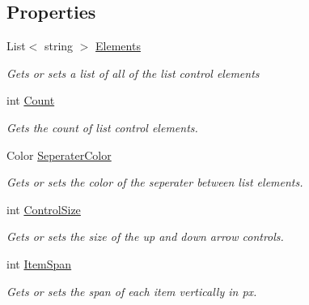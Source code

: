 \subsection*{Properties}
\begin{DoxyCompactItemize}
\item 
List$<$ string $>$ \hyperlink{class_m_b2_d_1_1_u_i_1_1_list_control_a868436cd81ebe891d8748da7b48a7c30}{Elements}
\begin{DoxyCompactList}\small\item\em Gets or sets a list of all of the list control elements \end{DoxyCompactList}\item 
int \hyperlink{class_m_b2_d_1_1_u_i_1_1_list_control_a231b53abfe2a6040567bb6bc3bf1cee4}{Count}
\begin{DoxyCompactList}\small\item\em Gets the count of list control elements. \end{DoxyCompactList}\item 
Color \hyperlink{class_m_b2_d_1_1_u_i_1_1_list_control_ac5c3ad4a524d48a490f7e4bfa088c0e1}{Seperater\+Color}
\begin{DoxyCompactList}\small\item\em Gets or sets the color of the seperater between list elements. \end{DoxyCompactList}\item 
int \hyperlink{class_m_b2_d_1_1_u_i_1_1_list_control_aafbb7c455f4ba9832be33a603287ed08}{Control\+Size}
\begin{DoxyCompactList}\small\item\em Gets or sets the size of the up and down arrow controls. \end{DoxyCompactList}\item 
int \hyperlink{class_m_b2_d_1_1_u_i_1_1_list_control_a67c7e5b6c19678f4c9d1fd111d87f056}{Item\+Span}
\begin{DoxyCompactList}\small\item\em Gets or sets the span of each item vertically in px. \end{DoxyCompactList}\end{DoxyCompactItemize}
